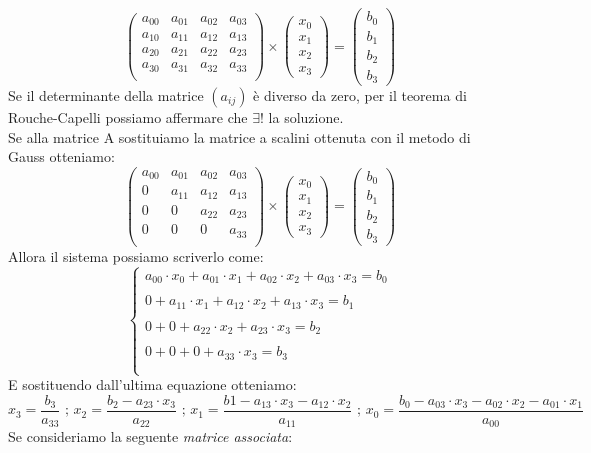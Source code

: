 \documentclass[10pt,a4paper]{article}
\begin{document}
\[\begin{pmatrix}
a_{0 0}&a_{0 1}&a_{0 2}&a_{0 3}\\
a_{1 0}&a_{1 1}&a_{1 2}&a_{1 3}\\
a_{2 0}&a_{2 1}&a_{2 2}&a_{2 3}\\
a_{3 0}&a_{3 1}&a_{3 2}&a_{3 3}\\
\end{pmatrix}
 \times 
 \begin{pmatrix}
 x_0\\
 x_1\\
 x_2\\
 x_3 
 \end{pmatrix}=
 \begin{pmatrix}
b_0\\
b_1\\
b_2\\
b_3
 \end{pmatrix}
 \]
 Se il determinante della matrice $ (a_{ij}) $ è diverso da zero, per il teorema di Rouche-Capelli possiamo affermare che $ \exists ! $ la soluzione.\\
 Se alla matrice A sostituiamo la matrice a scalini ottenuta con il metodo di Gauss otteniamo:
 \[\begin{pmatrix}
 a_{0 0}&a_{0 1}&a_{0 2}&a_{0 3}\\
 0&a_{1 1}&a_{1 2}&a_{1 3}\\
 0&0&a_{2 2}&a_{2 3}\\
 0&0&0&a_{3 3}\\
 \end{pmatrix}
 \times 
 \begin{pmatrix}
 x_0\\
 x_1\\
 x_2\\
 x_3 
 \end{pmatrix}=
 \begin{pmatrix}
 b_0\\
 b_1\\
 b_2\\
 b_3
 \end{pmatrix}
 \]
 Allora il sistema possiamo scriverlo come:
 \[ \left\{
 \begin{array}{rl}
 a_{00}\cdot x_0+a_{01}\cdot x_1+a_{02}\cdot x_2+a_{03}\cdot x_3=b_0\\\\
 0+a_{11}\cdot x_1+a_{12}\cdot x_2+a_{13}\cdot x_3=b_1\\\\
 0+0+a_{22}\cdot x_2+a_{23}\cdot x_3=b_2\\\\
0+0+0+a_{33}\cdot x_3=b_3\\\\
 \end{array}
 \right.   \]
 E sostituendo dall'ultima equazione otteniamo:
 \[ x_3=\frac{b_{3}}{a_{3 3}} \mbox{ ; } x_2=\frac{b_2-a_{2 3}\cdot x_3}{a_{2 2}}\mbox{ ; }
 x_1=\frac{b1-a_{1 3} \cdot x_3-a_{1 2}\cdot x_2}{a_{1 1}} \mbox{ ; }x_0=\frac{b_0-a_{0 3}\cdot x_3-a_{02}\cdot x_2-a_{01}\cdot x_1}{a_{00}} \]
 Se consideriamo la seguente \textit{matrice associata}: 
\end{document}
